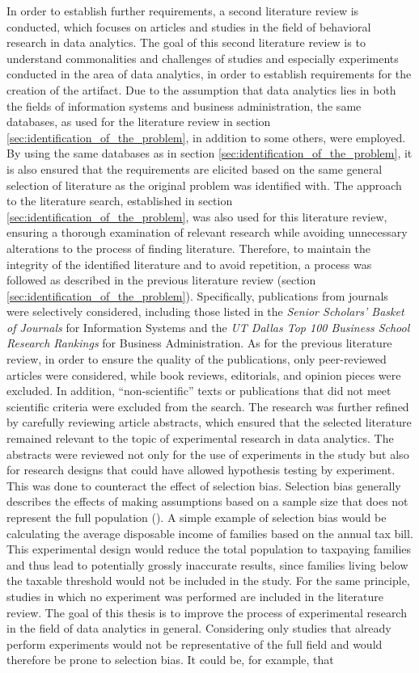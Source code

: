 In order to establish further requirements, a second literature review is conducted, which focuses on articles and studies in the field of behavioral research in data analytics. The goal of this second literature review is to understand commonalities and challenges of studies and especially experiments conducted in the area of data analytics, in order to establish requirements for the creation of the artifact. Due to the assumption that data analytics lies in both the fields of information systems and business administration, the same databases, as used for the literature review in section \ref{sec:identification_of_the_problem}, in addition to some others, were employed. By using the same databases as in section \ref{sec:identification_of_the_problem}, it is also ensured that the requirements are elicited based on the same general selection of literature as the original problem was identified with. The approach to the literature search, established in section \ref{sec:identification_of_the_problem}, was also used for this literature review, ensuring a thorough examination of relevant research while avoiding unnecessary alterations to the process of finding literature. Therefore, to maintain the integrity of the identified literature and to avoid repetition, a process was followed as described in the previous literature review (section \ref{sec:identification_of_the_problem}). Specifically, publications from journals were selectively considered, including those listed in the \textit{Senior Scholars' Basket of Journals} for Information Systems and the \textit{UT Dallas Top 100 Business School Research Rankings} for Business Administration. As for the previous literature review, in order to ensure the quality of the publications, only peer-reviewed articles were considered, while book reviews, editorials, and opinion pieces were excluded. In addition, \enquote{non-scientific} texts or publications that did not meet scientific criteria were excluded from the search. The research was further refined by carefully reviewing article abstracts, which ensured that the selected literature remained relevant to the topic of experimental research in data analytics. The abstracts were reviewed not only for the use of experiments in the study but also for research designs that could have allowed hypothesis testing by experiment. This was done to counteract the effect of selection bias. Selection bias generally describes the effects of making assumptions based on a sample size that does not represent the full population (\cite{Heckman.2010}). A simple example of selection bias would be calculating the average disposable income of families based on the annual tax bill. This experimental design would reduce the total population to taxpaying families and thus lead to potentially grossly inaccurate results, since families living below the taxable threshold would not be included in the study. For the same principle, studies in which no experiment was performed are included in the literature review. The goal of this thesis is to improve the process of experimental research in the field of data analytics in general. Considering only studies that already perform experiments would not be representative of the full field and would therefore be prone to selection bias. It could be, for example, that 